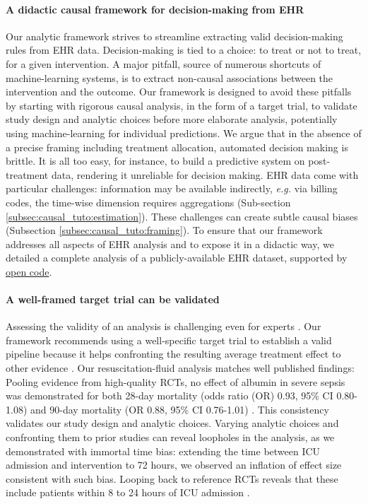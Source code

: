 \documentclass[french,12pt,twoside,a4paper]{book}
\begin{document}
\paragraph{A didactic causal framework for decision-making from EHR} Our analytic framework strives to streamline extracting valid decision-making
rules from EHR data. Decision-making is tied to a choice: to treat or not
to treat, for a given intervention. A major pitfall, source of numerous
shortcuts of machine-learning systems, is to extract non-causal
associations between the intervention and the outcome. Our framework is
designed to avoid these pitfalls by starting with rigorous causal analysis, in the
form of a target trial, to validate study design and analytic choices
before more elaborate analysis, potentially using machine-learning for
individual predictions.
%
We argue that in the absence of a precise framing including treatment
allocation, automated decision making is brittle. It is all too easy, for
instance, to build a predictive system on post-treatment data, rendering
it unreliable for decision making.
%
EHR data come with particular challenges: information may be available
indirectly, \emph{e.g.} via billing codes, the time-wise dimension requires
aggregations (Sub-section \ref{subsec:causal_tuto:estimation}). These challenges can create
subtle causal biases (Subsection \ref{subsec:causal_tuto:framing}).
%
To ensure that our framework addresses all aspects of EHR analysis and to
expose it in a didactic way, we detailed a complete analysis of a publicly-available EHR dataset,
supported by \href{https://github.com/soda-inria/causal_ehr_mimic}{open code}.

\paragraph{A well-framed target trial can be validated}

Assessing the validity of an analysis is challenging even for experts
\citep{ioannidis2005most,breznau2022observing}. Our framework recommends
using a well-specific target trial to establish a valid pipeline because
it helps confronting the resulting average treatment effect to other
evidence \citep{hernan_using_2016,wang2023emulation}. Our
resuscitation-fluid analysis matches well published findings:
Pooling evidence from high-quality RCTs, no effect of albumin in severe sepsis
was demonstrated for both 28-day mortality (odds ratio (OR) 0.93, 95\% CI
0.80-1.08) and 90-day mortality (OR 0.88, 95\% CI 0.76-1.01) \citep{xu2014comparison}. This consistency validates
our study design and analytic choices.
Varying analytic choices and confronting them to prior studies can reveal
loopholes in the analysis, as we demonstrated with immortal time bias:
extending the time between ICU admission and intervention to 72 hours,
we observed an inflation of effect size consistent with such
bias. Looping back to reference RCTs reveals that these
include patients within 8
to 24 hours of ICU admission \citep{safe2011impact,annane2013effects,
  caironi2014albumin}.
\end{document}
